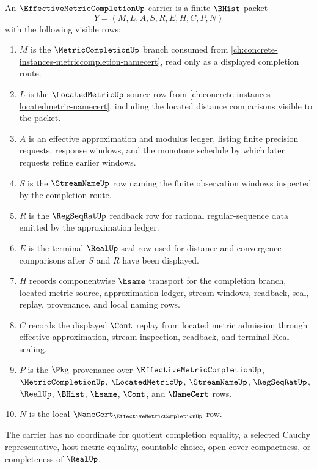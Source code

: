 \begin{definition}
\label{def:effective-metric-completion-carrier}
An $\EffectiveMetricCompletionUp$ carrier is a finite $\BHist$ packet
$$
Y=(M,L,A,S,R,E,H,C,P,N)
$$
with the following visible rows:
\begin{enumerate}
\item $M$ is the $\MetricCompletionUp$ branch consumed from \autoref{ch:concrete-instances-metriccompletion-namecert}, read only as a displayed completion route.
\item $L$ is the $\LocatedMetricUp$ source row from \autoref{ch:concrete-instances-locatedmetric-namecert}, including the located distance comparisons visible to the packet.
\item $A$ is an effective approximation and modulus ledger, listing finite precision requests, response windows, and the monotone schedule by which later requests refine earlier windows.
\item $S$ is the $\StreamNameUp$ row naming the finite observation windows inspected by the completion route.
\item $R$ is the $\RegSeqRatUp$ readback row for rational regular-sequence data emitted by the approximation ledger.
\item $E$ is the terminal $\RealUp$ seal row used for distance and convergence comparisons after $S$ and $R$ have been displayed.
\item $H$ records componentwise $\hsame$ transport for the completion branch, located metric source, approximation ledger, stream windows, readback, seal, replay, provenance, and local naming rows.
\item $C$ records the displayed $\Cont$ replay from located metric admission through effective approximation, stream inspection, readback, and terminal Real sealing.
\item $P$ is the $\Pkg$ provenance over $\EffectiveMetricCompletionUp$, $\MetricCompletionUp$, $\LocatedMetricUp$, $\StreamNameUp$, $\RegSeqRatUp$, $\RealUp$, $\BHist$, $\hsame$, $\Cont$, and $\NameCert$ rows.
\item $N$ is the local $\NameCert_{\EffectiveMetricCompletionUp}$ row.
\end{enumerate}
The carrier has no coordinate for quotient completion equality, a selected Cauchy representative, host metric equality, countable choice, open-cover compactness, or completeness of $\RealUp$.
\end{definition}

